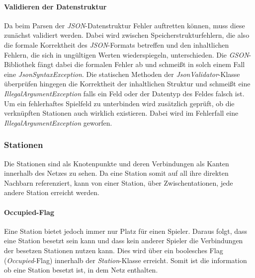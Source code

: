             \paragraph{Validieren der Datenstruktur}\label{validate}
                
                Da beim Parsen der \textit{JSON}-Datenstruktur Fehler auftretten können, muss diese zunächst validiert werden.
                Dabei wird zwischen Speicherstrukturfehlern, die also die formale Korrektheit des \textit{JSON}-Formats betreffen und
                den inhaltlichen Fehlern, die sich in ungültigen Werten wiederspiegeln, unterschieden.
                Die \textit{GSON}-Bibliothek fängt dabei die formalen Fehler ab und schmeißt in solch einem Fall eine \textit{JsonSyntaxException}.
                Die statischen Methoden der \textit{JsonValidator}-Klasse überprüfen hingegen die Korrektheit der inhaltlichen Struktur und schmeißt
                eine \textit{IllegalArgumentException} falls ein Feld oder der Datentyp des Feldes falsch ist.
                \newline
                Um ein fehlerhaftes Spielfeld zu unterbinden wird zusätzlich geprüft, ob die verknüpften Stationen auch wirklich existieren.
                Dabei wird im Fehlerfall eine \textit{IllegalArgumentException} geworfen.
                
            \subsubsection{Stationen}\label{stations}
                Die Stationen sind als Knotenpunkte und deren Verbindungen als Kanten innerhalb des Netzes zu sehen.
                Da eine Station somit auf all ihre direkten Nachbarn referenziert, kann von einer Station, über Zwischentationen,
                jede andere Station erreicht werden.
                
                \paragraph{Occupied-Flag}
                    Eine Station bietet jedoch immer nur Platz für einen Spieler.
                    Daraus folgt, dass eine Station besetzt sein kann und dass kein anderer Spieler die Verbindungen der besetzen Stationen nutzen kann.
                    Dies wird über ein boolesches Flag (\textit{Occupied}-Flag) innerhalb der \textit{Station}-Klasse erreicht.
                    Somit ist die information ob eine Station besetzt ist, in dem Netz enthalten.

